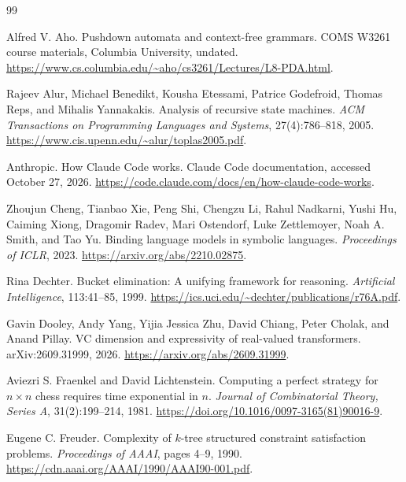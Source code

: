 \documentclass[11pt,twoside]{article}
\theoremstyle{definition}
\theoremstyle{remark}
\begin{document}
\clearpage
\begin{thebibliography}{99}

Alfred V. Aho.
\newblock Pushdown automata and context-free grammars.
\newblock COMS W3261 course materials, Columbia University, undated.
\newblock \url{https://www.cs.columbia.edu/~aho/cs3261/Lectures/L8-PDA.html}.

Rajeev Alur, Michael Benedikt, Kousha Etessami, Patrice Godefroid,
Thomas Reps, and Mihalis Yannakakis.
\newblock Analysis of recursive state machines.
\newblock \emph{ACM Transactions on Programming Languages and Systems},
27(4):786--818, 2005.
\newblock \url{https://www.cis.upenn.edu/~alur/toplas2005.pdf}.

Anthropic.
\newblock How Claude Code works.
\newblock Claude Code documentation, accessed October 27, 2026.
\newblock \url{https://code.claude.com/docs/en/how-claude-code-works}.

Zhoujun Cheng, Tianbao Xie, Peng Shi, Chengzu Li, Rahul Nadkarni,
Yushi Hu, Caiming Xiong, Dragomir Radev, Mari Ostendorf,
Luke Zettlemoyer, Noah A. Smith, and Tao Yu.
\newblock Binding language models in symbolic languages.
\newblock \emph{Proceedings of ICLR}, 2023.
\newblock \url{https://arxiv.org/abs/2210.02875}.

Rina Dechter.
\newblock Bucket elimination: A unifying framework for reasoning.
\newblock \emph{Artificial Intelligence}, 113:41--85, 1999.
\newblock \url{https://ics.uci.edu/~dechter/publications/r76A.pdf}.

Gavin Dooley, Andy Yang, Yijia Jessica Zhu, David Chiang, Peter Cholak,
and Anand Pillay.
\newblock VC dimension and expressivity of real-valued transformers.
\newblock arXiv:2609.31999, 2026.
\newblock \url{https://arxiv.org/abs/2609.31999}.

Aviezri S. Fraenkel and David Lichtenstein.
\newblock Computing a perfect strategy for $n\times n$ chess requires
time exponential in $n$.
\newblock \emph{Journal of Combinatorial Theory, Series A},
31(2):199--214, 1981.
\newblock \url{https://doi.org/10.1016/0097-3165(81)90016-9}.

Eugene C. Freuder.
\newblock Complexity of $k$-tree structured constraint satisfaction problems.
\newblock \emph{Proceedings of AAAI}, pages 4--9, 1990.
\newblock \url{https://cdn.aaai.org/AAAI/1990/AAAI90-001.pdf}.


\end{thebibliography}
\end{document}
